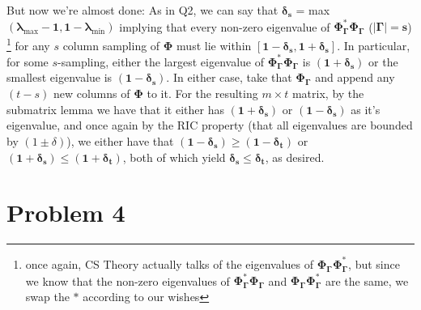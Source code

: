 \documentclass[a4paper,11pt]{article}
\numberwithin{definition}{section}
\numberwithin{mytheorem}{subsection}
\begin{document}
But now we're almost done: As in Q2, we can say that $\boldsymbol{\delta_{s}}$ = max$\boldsymbol{(\lambda_{\mathrm{max}}-1, 1-\lambda_{\mathrm{min}})}$ implying that every non-zero eigenvalue of $\boldsymbol{\Phi_{\Gamma}^*\Phi_{\Gamma}}$ ($\boldsymbol{|\Gamma| = s}$) \footnote{once again, CS Theory actually talks of the eigenvalues of $\boldsymbol{\Phi_{\Gamma}\Phi_{\Gamma}^*}$, but since we know that the non-zero eigenvalues of $\boldsymbol{\Phi_{\Gamma}^*\Phi_{\Gamma}}$ and $\boldsymbol{\Phi_{\Gamma}\Phi_{\Gamma}^*}$ are the same, we swap the $*$ according to our wishes} for any $s$ column sampling of $\boldsymbol{\Phi}$ must lie within $\boldsymbol{[1-\delta_s, 1+\delta_s]}$. In particular, for some $s$-sampling, either the largest eigenvalue of $\boldsymbol{\Phi_{\Gamma}^*\Phi_{\Gamma}}$ is $\boldsymbol{(1+\delta_s)}$ or the smallest eigenvalue is $\boldsymbol{(1-\delta_s)}$. In either case, take that $\boldsymbol{\Phi_{\Gamma}}$ and append any $(t-s)$ new columns of $\boldsymbol{\Phi}$ to it. For the resulting $m\times t$ matrix, by the submatrix lemma we have that it either has $\boldsymbol{(1+\delta_s)}$ or $\boldsymbol{(1-\delta_s)}$ as it's eigenvalue, and once again by the RIC property (that all eigenvalues are bounded by $(1\pm \delta)$), we either have that $\boldsymbol{(1-\delta_s) \geq (1-\delta_t)}$ or $\boldsymbol{(1+\delta_s) \leq (1+\delta_t)}$, both of which yield $\boldsymbol{\delta_s\leq\delta_t}$, as desired.


\section{Problem 4}
\end{document}
